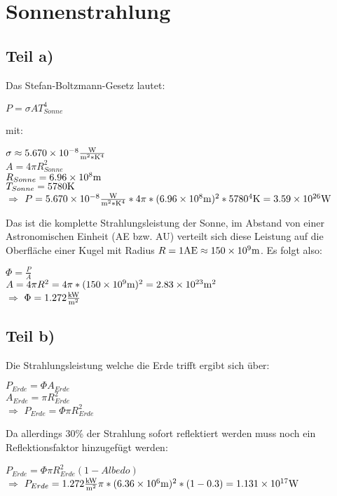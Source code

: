 \section{Sonnenstrahlung}
\subsection{Teil a)}
Das Stefan-Boltzmann-Gesetz lautet:
\begin{center}
    $P=\sigma A T^4_{Sonne}$\\
\end{center}
mit:
\begin{center}
    $\sigma \approx 5.670 \times 10^{-8}\si[]{\frac{W}{m^2*K^4}}$\\
    $A=4\pi R^2_{Sonne}$\\
    $R_{Sonne}=6.96\times 10^8\si[]{m}$\\
    $T_{Sonne}=5780\si[]{K}$\\
    $\Rightarrow$ $P=5.670 \times 10^{-8}\si[]{\frac{W}{m^2*K^4}} *4\pi*(6.96\times 10^{8}\si[]{m})^2 *5780^4\si[]{K}=3.59\times 10^{26}\si[]{W}$

\end{center}
Das ist die komplette Strahlungsleistung der Sonne, im Abstand von einer Astronomischen Einheit (AE bzw. AU) 
verteilt sich diese Leistung auf die Oberfläche einer Kugel mit Radius $R=1\si[]{AE}\approx 150\times 10^9\si[]{m}$.
Es folgt also:
\begin{center}
    $\Phi=\frac{P}{A}$\\
    $A=4\pi R^2=4\pi*(150\times 10^{9}\si[]{m})^2=2.83\times 10^{23}\si[]{m^2}$\\
    $\Rightarrow$ $\Phi=1.272\si[]{\frac{kW}{m^2}}$
\end{center}
\subsection{Teil b)}
Die Strahlungsleistung welche die Erde trifft ergibt sich über:
\begin{center}
    $P_{Erde}=\Phi A_{Erde}$\\
    $A_{Erde}=\pi R^2_{Erde}$\\
    $\Rightarrow$ $P_{Erde}=\Phi \pi R^2_{Erde}$
\end{center}
Da allerdings 30\% der Strahlung sofort reflektiert werden muss noch ein Reflektionsfaktor hinzugefügt werden:
\begin{center}
    $P_{Erde}=\Phi \pi R^2_{Erde}(1-Albedo)$\\
    $\Rightarrow$ $P_{Erde}=1.272\si[]{\frac{kW}{m^2}}\pi *(6.36\times 10^6\si[]{m})^2*(1-0.3)=1.131\times 10^{17}\si[]{W}$
\end{center}

